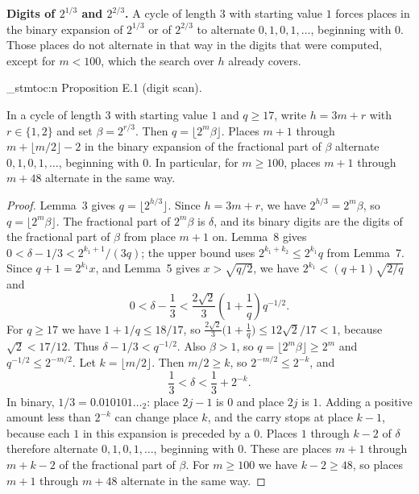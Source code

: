 \documentclass[11pt]{article}
\newenvironment{named}[1]{%
  \par\addvspace{\medskipamount}%
  \pagebreak[3]%
  \noindent{\bfseries #1}\space\ignorespaces
  \stmtoc{#1}%
}{\par\addvspace{\medskipamount}}
\newcommand{\topic}[1]{\par\noindent\textbf{#1}}
\newcommand{\stmtoc}[1]{ \qn_stmtoc:n {#1} }
\begin{document}
\topic{Digits of $2^{1/3}$ and $2^{2/3}$.}
A cycle of length $3$ with starting value $1$ forces places in the binary expansion of $2^{1/3}$ or of $2^{2/3}$ to alternate $0, 1, 0, 1, \ldots$, beginning with $0$.
Those places do not alternate in that way in the digits that were computed, except for $m < 100$, which the search over $h$ already covers.

\begin{named}{Proposition E.1 (digit scan).}
In a cycle of length $3$ with starting value $1$ and $q \ge 17$, write $h = 3m + r$ with $r \in \{1, 2\}$ and set $\beta = 2^{r/3}$.
Then $q = \lfloor 2^m \beta \rfloor$.
Places $m+1$ through $m + \lfloor m/2 \rfloor - 2$ in the binary expansion of the fractional part of $\beta$ alternate $0, 1, 0, 1, \ldots$, beginning with $0$.
In particular, for $m \ge 100$, places $m+1$ through $m+48$ alternate in the same way.
\end{named}

\begin{proof}
Lemma~3 gives $q = \lfloor 2^{h/3} \rfloor$.
Since $h = 3m + r$, we have $2^{h/3} = 2^m \beta$, so $q = \lfloor 2^m \beta \rfloor$.
The fractional part of $2^m \beta$ is $\delta$, and its binary digits are the digits of the fractional part of $\beta$ from place $m+1$ on.
Lemma~8 gives $0 < \delta - 1/3 < 2^{k_1+1}/(3q)$; the upper bound uses $2^{k_1+k_2} \le 2^{k_1} q$ from Lemma~7.
Since $q + 1 = 2^{k_1} x$, and Lemma~5 gives $x > \sqrt{q/2}$, we have $2^{k_1} < (q+1)\sqrt{2/q}$ and
\[
0 < \delta - \frac{1}{3} < \frac{2\sqrt{2}}{3}\left(1 + \frac{1}{q}\right) q^{-1/2}.
\]
For $q \ge 17$ we have $1 + 1/q \le 18/17$, so $\frac{2\sqrt{2}}{3}\bigl(1 + \frac{1}{q}\bigr) \le 12\sqrt{2}/17 < 1$, because $\sqrt{2} < 17/12$.
Thus $\delta - 1/3 < q^{-1/2}$.
Also $\beta > 1$, so $q = \lfloor 2^m \beta \rfloor \ge 2^m$ and $q^{-1/2} \le 2^{-m/2}$.
Let $k = \lfloor m/2 \rfloor$. Then $m/2 \ge k$, so $2^{-m/2} \le 2^{-k}$, and
\[
\frac13 < \delta < \frac13 + 2^{-k}.
\]
In binary, $1/3 = 0.010101\ldots{}_2$: place $2j-1$ is $0$ and place $2j$ is $1$.
Adding a positive amount less than $2^{-k}$ can change place $k$, and the carry stops at place $k-1$, because each $1$ in this expansion is preceded by a $0$.
Places $1$ through $k-2$ of $\delta$ therefore alternate $0, 1, 0, 1, \ldots$, beginning with $0$.
These are places $m+1$ through $m + k - 2$ of the fractional part of $\beta$.
For $m \ge 100$ we have $k - 2 \ge 48$, so places $m+1$ through $m+48$ alternate in the same way.
\end{proof}
\end{document}
